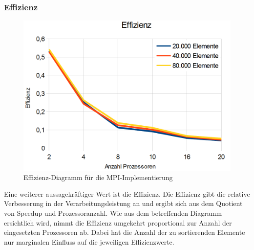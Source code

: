 \documentclass[a4paper,12pt]{scrartcl}
\begin{document}
\subsubsection{Effizienz}
\begin{figure}[htb]
  \begin{center}
    \includegraphics[width=1\hsize]{../effizienz.png}
  \end{center}
  \caption{\label{mpieffizienz}
    Effizienz-Diagramm f\"ur die MPI-Implementierung}
\end{figure}
Eine weiterer aussagekräftiger Wert ist die Effizienz.
Die Effizienz gibt die relative Verbesserung in der Verarbeitungsleistung an und ergibt sich aus dem Quotient von Speedup und Prozessoranzahl.
Wie aus dem betreffenden Diagramm ersichtlich wird, nimmt die Effizienz umgekehrt proportional zur Anzahl der eingesetzten
Prozessoren ab. Dabei hat die Anzahl der zu sortierenden Elemente nur marginalen Einfluss auf die jeweiligen Effizienzwerte. 
\end{document}
